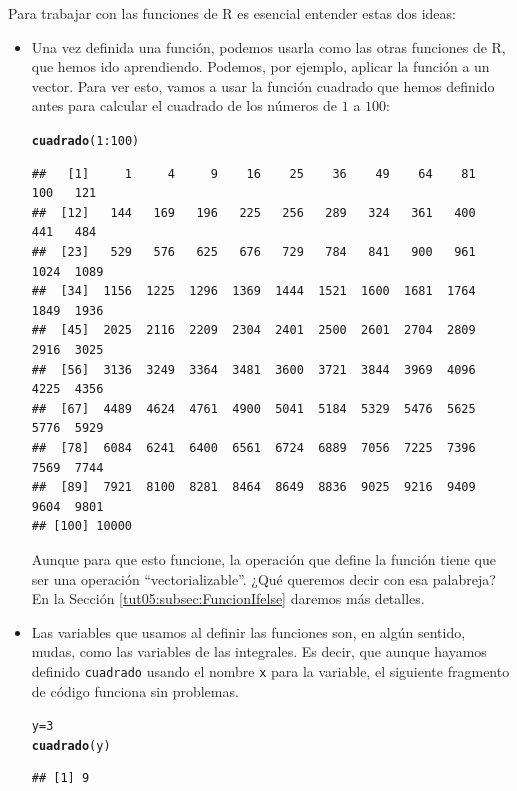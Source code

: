 \documentclass[10pt,a4paper]{article}\usepackage[]{graphicx}\usepackage[]{color}
\makeatletter
\newcommand{\hlnum}[1]{\textcolor[rgb]{0.686,0.059,0.569}{#1}}%
\newcommand{\hlopt}[1]{\textcolor[rgb]{0,0,0}{#1}}%
\newcommand{\hlstd}[1]{\textcolor[rgb]{0.345,0.345,0.345}{#1}}%
\newcommand{\hlkwb}[1]{\textcolor[rgb]{0.69,0.353,0.396}{#1}}%
\newcommand{\hlkwd}[1]{\textcolor[rgb]{0.737,0.353,0.396}{\textbf{#1}}}%
\newenvironment{kframe}{%
 \def\at@end@of@kframe{}%
 \ifinner\ifhmode%
  \def\at@end@of@kframe{\end{minipage}}%
  \begin{minipage}{\columnwidth}%
 \fi\fi%
 \def\FrameCommand##1{\hskip\@totalleftmargin \hskip-\fboxsep
 \colorbox{shadecolor}{##1}\hskip-\fboxsep
     \hskip-\linewidth \hskip-\@totalleftmargin \hskip\columnwidth}%
 \MakeFramed {\advance\hsize-\width
   \@totalleftmargin\z@ \linewidth\hsize
   \@setminipage}}%
 {\par\unskip\endMakeFramed%
 \at@end@of@kframe}
\newenvironment{knitrout}{}{} %
\makeatother
\begin{document}
Para trabajar con las funciones de R es esencial entender estas dos ideas:
\begin{itemize}
  \item Una vez definida una función, podemos usarla como las otras funciones de R, que hemos ido aprendiendo. Podemos, por ejemplo, aplicar la función a un vector. Para ver esto, vamos a usar la función cuadrado que hemos definido antes para calcular el cuadrado de los números de $1$ a $100$:
\begin{knitrout}
\color{fgcolor}\begin{kframe}
\begin{alltt}
\hlkwd{cuadrado}\hlstd{(}\hlnum{1}\hlopt{:}\hlnum{100}\hlstd{)}
\end{alltt}
\begin{verbatim}
##   [1]     1     4     9    16    25    36    49    64    81   100   121
##  [12]   144   169   196   225   256   289   324   361   400   441   484
##  [23]   529   576   625   676   729   784   841   900   961  1024  1089
##  [34]  1156  1225  1296  1369  1444  1521  1600  1681  1764  1849  1936
##  [45]  2025  2116  2209  2304  2401  2500  2601  2704  2809  2916  3025
##  [56]  3136  3249  3364  3481  3600  3721  3844  3969  4096  4225  4356
##  [67]  4489  4624  4761  4900  5041  5184  5329  5476  5625  5776  5929
##  [78]  6084  6241  6400  6561  6724  6889  7056  7225  7396  7569  7744
##  [89]  7921  8100  8281  8464  8649  8836  9025  9216  9409  9604  9801
## [100] 10000
\end{verbatim}
\end{kframe}
\end{knitrout}
        Aunque para que esto funcione, la operación que define la función tiene que ser una operación ``vectorializable''. ¿Qué queremos decir con esa palabreja? En la Sección \ref{tut05:subsec:FuncionIfelse} daremos más detalles.

  \item Las variables que usamos al definir las funciones son, en algún sentido, mudas, como las variables de las integrales. Es decir, que aunque hayamos definido {\tt cuadrado} usando el nombre {\tt x} para la variable, el siguiente fragmento de código funciona sin problemas.
\begin{knitrout}
\color{fgcolor}\begin{kframe}
\begin{alltt}
\hlstd{y} \hlkwb{=} \hlnum{3}
\hlkwd{cuadrado}\hlstd{(y)}
\end{alltt}
\begin{verbatim}
## [1] 9
\end{verbatim}
\end{kframe}
\end{knitrout}

\end{itemize}
\end{document}
